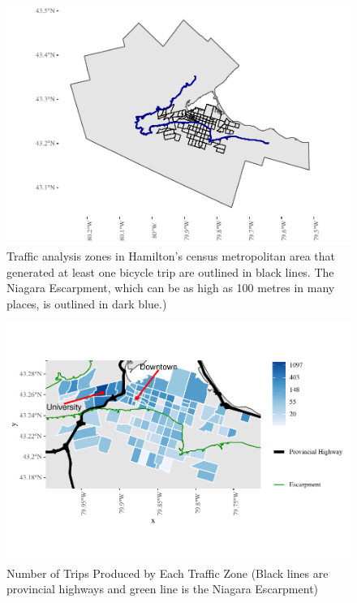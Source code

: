 \documentclass[smallextended]{svjour3}       %
\begin{document}
\begin{figure}
\centering
\includegraphics{BE-correlates-cycling-flows_files/figure-latex/context-plot-1.pdf}
\caption{\label{fig:context-plot} Traffic analysis zones in Hamilton's
census metropolitan area that generated at least one bicycle trip are
outlined in black lines. The Niagara Escarpment, which can be as high as
100 metres in many places, is outlined in dark blue.)}
\end{figure}

\begin{figure}
\centering
\includegraphics{BE-correlates-cycling-flows_files/figure-latex/trips-by-origin-1.pdf}
\caption{\label{fig:trips-by-origin} Number of Trips Produced by Each
Traffic Zone (Black lines are provincial highways and green line is the
Niagara Escarpment)}
\end{figure}
\end{document}
